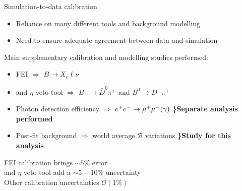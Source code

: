 \documentclass[xcolor=dvipsnames]{beamer}
\begin{document}
\begin{frame}{Simulation-to-data calibration}

   \scriptsize\centering
   
   \begin{itemize}
      \item Reliance on many different tools and background modelling
      \item Need to ensure adequate agreement between data and simulation
   \end{itemize}

   \vspace{10pt}

  Main supplementary calibration and modelling studies performed:

   \begin{itemize}
      \item FEI \hspace{81pt} $\Rightarrow$ $B\to X_c \ell \nu$ 
      \item \piz and $\eta$ veto tool \hspace{27pt}  $\Rightarrow$ $B^+\to \bar{D}^0\pi^+$ and $B^0\to D^-\pi^+$
      \item Photon detection efficiency  $\Rightarrow$ $e^+e^-\rightarrow\mu^+\mu^-(\gamma)$ \hspace{27pt} \textbf{\}Separate analysis performed}
      \item Post-fit background \hspace{24pt} $\Rightarrow$ world average $\mathcal{B}$ variations \hspace{15pt} \textbf{\}Study for this analysis}
   \end{itemize}

   \vspace{10pt}

   \ra FEI calibration brings $\sim 5\%$ error\\
   \ra \piz and $\eta$ veto tool add a $\sim 5-10\%$ uncertainty\\
   \ra Other calibration uncertainties $\mathcal{O}(1\%)$\\

\end{frame}
\end{document}
